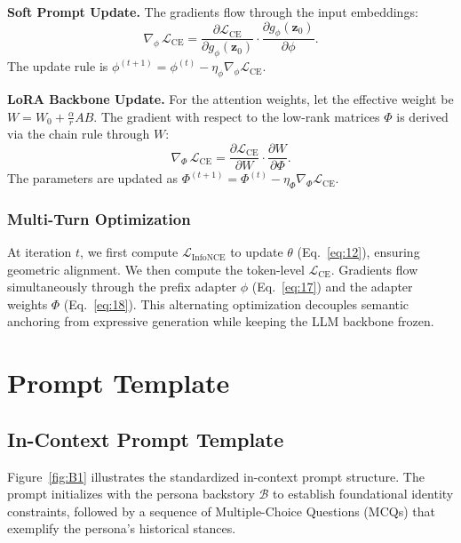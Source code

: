 \noindent \textbf{Soft Prompt Update.} 
The gradients flow through the input embeddings:
\begin{equation}
    \nabla_{\phi}\,\mathcal{L}_{\mathrm{CE}} = \frac{\partial \mathcal{L}_{\mathrm{CE}}}{\partial g_{\phi}(\mathbf{z}_0)} \cdot \frac{\partial g_{\phi}(\mathbf{z}_0)}{\partial \phi}.
    \label{eq:17}
\end{equation}
The update rule is $\phi^{(t+1)} = \phi^{(t)} - \eta_{\phi}\nabla_{\phi}\mathcal{L}_{\mathrm{CE}}$.

\noindent \textbf{LoRA Backbone Update.} 
For the attention weights, let the effective weight be $W = W_0 + \frac{\alpha}{r}AB$. The gradient with respect to the low-rank matrices $\Phi$ is derived via the chain rule through $W$:
\begin{equation}
    \nabla_{\Phi}\,\mathcal{L}_{\mathrm{CE}} = \frac{\partial \mathcal{L}_{\mathrm{CE}}}{\partial W} \cdot \frac{\partial W}{\partial \Phi}.
    \label{eq:18}
\end{equation}
The parameters are updated as $\Phi^{(t+1)} = \Phi^{(t)} - \eta_{\Phi}\nabla_{\Phi}\mathcal{L}_{\mathrm{CE}}$.

\subsubsection{Multi-Turn Optimization}  
At iteration $t$, we first compute $\mathcal{L}_{\mathrm{InfoNCE}}$ to update $\theta$ (Eq.~\ref{eq:12}), ensuring geometric alignment. We then compute the token-level $\mathcal{L}_{\mathrm{CE}}$. Gradients flow simultaneously through the prefix adapter $\phi$ (Eq.~\ref{eq:17}) and the adapter weights $\Phi$ (Eq.~\ref{eq:18}). This alternating optimization decouples semantic anchoring from expressive generation while keeping the LLM backbone frozen.








\section{Prompt Template}\label{sec: prompt}

\subsection{In-Context Prompt Template}
Figure~\ref{fig:B1} illustrates the standardized in-context prompt structure. The prompt initializes with the persona backstory $\mathcal{B}$ to establish foundational identity constraints, followed by a sequence of Multiple-Choice Questions (MCQs) that exemplify the persona's historical stances.


